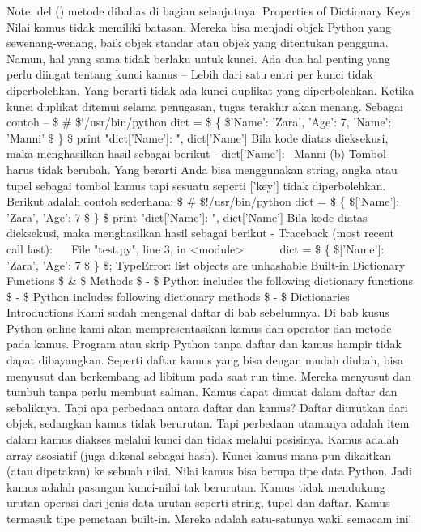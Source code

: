 Note: del () metode dibahas di bagian selanjutnya. 
Properties of Dictionary Keys 
Nilai kamus tidak memiliki batasan. Mereka bisa menjadi objek Python yang sewenang-wenang, baik objek standar atau objek yang ditentukan pengguna. Namun, hal yang sama tidak berlaku untuk kunci. 
Ada dua hal penting yang perlu diingat tentang kunci kamus – 
Lebih dari satu entri per kunci tidak diperbolehkan. Yang berarti tidak ada kunci duplikat yang diperbolehkan. Ketika kunci duplikat ditemui selama penugasan, tugas terakhir akan menang. Sebagai contoh – 
   \$  \#  \$!/usr/bin/python 
  dict =  \$  \{  \$'Name': 'Zara', 'Age': 7, 'Name': 'Manni' \$  \}  \$ 
  print "dict['Name']: ", dict['Name'] 
Bila kode diatas dieksekusi, maka menghasilkan hasil sebagai berikut - 
  dict['Name']:~ Manni 
(b) Tombol harus tidak berubah. Yang berarti Anda bisa menggunakan string, angka atau tupel sebagai tombol kamus tapi sesuatu seperti ['key'] tidak diperbolehkan. Berikut adalah contoh sederhana: 
   \$  \#  \$!/usr/bin/python 
  dict =  \$  \{  \$['Name']: 'Zara', 'Age': 7 \$  \}  \$ 
  print "dict['Name']: ", dict['Name'] 
Bila kode diatas dieksekusi, maka menghasilkan hasil sebagai berikut - 
  Traceback (most recent call last): 
~~     File "test.py", line 3, in <module> 
~~~~~     dict =  \$  \{  \$['Name']: 'Zara', 'Age': 7 \$  \}  \$; 
  TypeError: list objects are unhashable 
Built-in Dictionary Functions  \$  \&  \$ Methods  \$ - \$ 
Python includes the following dictionary functions  \$ - \$ 
Python includes following dictionary methods  \$ - \$ 
Dictionaries 
Introductions 
Kami sudah mengenal daftar di bab sebelumnya. Di bab kusus Python online kami akan mempresentasikan kamus dan operator dan metode pada kamus. Program atau skrip Python tanpa daftar dan kamus hampir tidak dapat dibayangkan. Seperti daftar kamus yang bisa dengan mudah diubah, bisa menyusut dan berkembang ad libitum pada saat run time. Mereka menyusut dan tumbuh tanpa perlu membuat salinan. Kamus dapat dimuat dalam daftar dan sebaliknya. Tapi apa perbedaan antara daftar dan kamus? Daftar diurutkan dari objek, sedangkan kamus tidak berurutan. Tapi perbedaan utamanya adalah item dalam kamus diakses melalui kunci dan tidak melalui posisinya. Kamus adalah array asosiatif (juga dikenal sebagai hash). Kunci kamus mana pun dikaitkan (atau dipetakan) ke sebuah nilai. Nilai kamus bisa berupa tipe data Python. Jadi kamus adalah pasangan kunci-nilai tak berurutan. 
Kamus tidak mendukung urutan operasi dari jenis data urutan seperti string, tupel dan daftar. Kamus termasuk tipe pemetaan built-in. Mereka adalah satu-satunya wakil semacam ini! 

